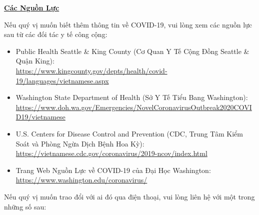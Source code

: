 \documentclass[10pt]{article}
\begin{document}
\bigskip

\large \underline{\textbf{Các Nguồn Lực}}

Nếu quý vị muốn biết thêm thông tin về COVID-19, vui lòng xem các nguồn lực sau
từ các đối tác y tế công cộng:

\begin{itemize}
\item
  Public Health \textemdash Seattle \& King County (Cơ Quan Y Tế Cộng Đồng \textemdash Seattle \& Quận King): \\
  \url{https://www.kingcounty.gov/depts/health/covid-19/languages/vietnamese.aspx}

\item

  Washington State Department of Health (Sở Y Tế Tiểu Bang Washington):\\
  \url{https://www.doh.wa.gov/Emergencies/NovelCoronavirusOutbreak2020COVID19/vietnamese}

\item
  U.S. Centers for Disease Control and Prevention (CDC, Trung Tâm Kiểm Soát và
  Phòng Ngừa Dịch Bệnh Hoa Kỳ):\\
  \url{https://vietnamese.cdc.gov/coronavirus/2019-ncov/index.html}

\item
  Trang Web Nguồn Lực về COVID-19 của Đại Học Washington:\\
  \url{https://www.washington.edu/coronavirus/}

\end{itemize}

Nếu quý vị muốn trao đổi với ai đó qua điện thoại, vui lòng liên hệ với một
trong những số sau: 
\end{document}
